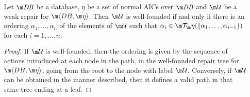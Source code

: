 \begin{proposition}
  \label{prop:wf}
  Let $\db$ be a database, $\eta$ be a set of normal AICs over $\db$ and $\UU$ be a weak repair for $\fulldb$.
  Then $\UU$ is well-founded if and only if there is an ordering $\alpha_1,\ldots,\alpha_n$ of the elements of $\UU$ such that $\alpha_i\in\Op(\{\alpha_1,\ldots,\alpha_{i-1}\})$ for each $i=1,\ldots,n$.
\end{proposition}
\begin{proof}
  If $\UU$ is well-founded, then the ordering is given by the sequence of actions introduced at each node in the path, in the well-founded repair tree for $\fulldb$, going from the root to the node with label $\UU$.
  Conversely, if $\UU$ can be obtained in the manner described, then it defines a valid path in that same tree ending at a leaf.
\end{proof}



